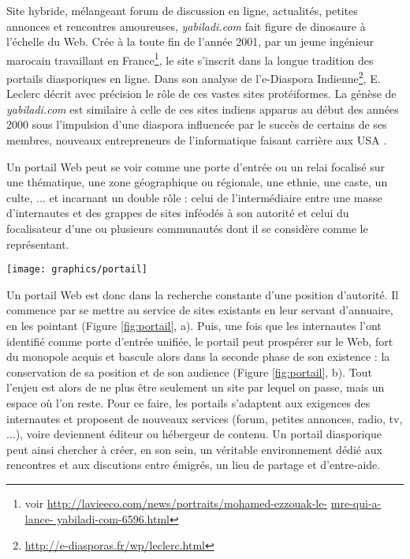 \documentclass[symmetric,justified,marginals=raggedouter]{tufte-book}
\begin{document}
Site hybride, mélangeant forum de discussion en ligne, actualités, petites annonces et rencontres amoureuses, \textit{yabiladi.com} fait figure de dinosaure à l'échelle du Web. Crée à la toute fin de l'année 2001, par un jeune ingénieur marocain travaillant en France\footnote{voir \url{http://lavieeco.com/news/portraits/mohamed-ezzouak-le-} \url{mre-qui-a-lance-
yabiladi-com-6596.html}}, le site s'inscrit dans la longue tradition des portails diasporiques en ligne. Dans son analyse de l'e-Diaspora Indienne\footnote{\url{http://e-diasporas.fr/wp/leclerc.html}}, E. Leclerc décrit avec précision le rôle de ces vastes sites protéiformes. La génèse de \textit{yabiladi.com} est similaire à celle de ces sites indiens apparus au début des années 2000 sous l'impulsion d'une diaspora influencée par le succès de certains de ses membres, nouveaux entrepreneurs de l'informatique faisant carrière aux USA \citep{leclerc_cyberespace_2012}. 

Un portail Web peut se voir comme une porte d'entrée ou un relai focalisé sur une thématique, une zone géographique ou régionale, une ethnie, une caste, un culte, ... et incarnant un double rôle : celui de l'intermédiaire entre une masse d'internautes et des grappes de sites inféodés à son autorité et celui du focalisateur d'une ou plusieurs communautés dont il se considère comme le représentant. 

\begin{figure*}
  \texttt{[image: graphics/portail]}
  \caption{Dynamique de création d'un portail Web autour d'une communauté de sites}
  \label{fig:portail}
\end{figure*}

\noindent Un portail Web est donc dans la recherche constante d'une position d'autorité. Il commence par se mettre au service de sites existants en leur servant d'annuaire, en les pointant (Figure \ref{fig:portail}, a). Puis, une fois que les internautes l'ont identifié comme porte d'entrée unifiée, le portail peut prospérer sur le Web, fort du monopole acquis et bascule alors dans la seconde phase de son existence : la conservation de sa position et de son audience (Figure \ref{fig:portail}, b). Tout l'enjeu est alors de ne plus être seulement un site par lequel on passe, mais un espace où l'on reste. Pour ce faire, les portails s'adaptent aux exigences des internautes et proposent de nouveaux services (forum, petites annonces, radio, tv, ...), voire deviennent éditeur ou hébergeur de contenu. Un portail diasporique peut ainsi chercher à créer, en son sein, un véritable environnement dédié aux rencontres et aux discutions entre émigrés, un lieu de partage et d'entre-aide.  
\end{document}

